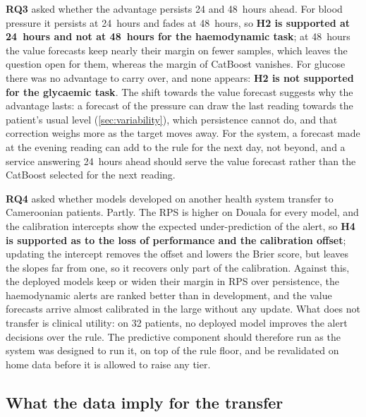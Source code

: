 \documentclass[11pt,a4paper,oneside]{report}
\begin{document}
\textbf{RQ3} asked whether the advantage persists 24 and 48~hours ahead. For blood pressure it persists at 24~hours and fades at 48~hours, so \textbf{H2 is supported at 24~hours and not at 48~hours for the haemodynamic task}; at 48~hours the value forecasts keep nearly their margin on fewer samples, which leaves the question open for them, whereas the margin of CatBoost vanishes. For glucose there was no advantage to carry over, and none appears: \textbf{H2 is not supported for the glycaemic task}. The shift towards the value forecast suggests why the advantage lasts: a forecast of the pressure can draw the last reading towards the patient's usual level (\cref{sec:variability}), which persistence cannot do, and that correction weighs more as the target moves away. For the system, a forecast made at the evening reading can add to the rule for the next day, not beyond, and a service answering 24~hours ahead should serve the value forecast rather than the CatBoost selected for the next reading.

\textbf{RQ4} asked whether models developed on another health system transfer to Cameroonian patients. Partly. The RPS is higher on Douala for every model, and the calibration intercepts show the expected under-prediction of the alert, so \textbf{H4 is supported as to the loss of performance and the calibration offset}; updating the intercept removes the offset and lowers the Brier score, but leaves the slopes far from one, so it recovers only part of the calibration. Against this, the deployed models keep or widen their margin in RPS over persistence, the haemodynamic alerts are ranked better than in development, and the value forecasts arrive almost calibrated in the large without any update. What does not transfer is clinical utility: on 32 patients, no deployed model improves the alert decisions over the rule. The predictive component should therefore run as the system was designed to run it, on top of the rule floor, and be revalidated on home data before it is allowed to raise any tier.

\subsection{What the data imply for the transfer}
\end{document}
